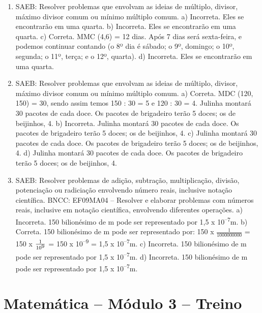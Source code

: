 \begin{enumerate}
\item
SAEB: Resolver problemas que envolvam as ideias de múltiplo, 
divisor, máximo divisor comum ou mínimo múltiplo comum.
a) Incorreta. Eles se encontrarão em uma quarta.
b) Incorreta. Eles se encontrarão em uma quarta.
c) Correta. MMC (4,6) = 12 dias. Após 7 dias será sexta-feira, e podemos 
continuar contando (o 8º dia é sábado; o 9º, domingo; o 10º, segunda;
o 11º, terça; e o 12º, quarta).
d) Incorreta. Eles se encontrarão em uma quarta.

\item
SAEB: Resolver problemas que envolvam as ideias de múltiplo, 
divisor, máximo divisor comum ou mínimo múltiplo comum.
a) Correta. MDC (120, 150) = 30, sendo assim temos 150 : 30 = 5 e 120 : 30 = 4. Julinha montará 30 pacotes de cada doce. Os pacotes de brigadeiro terão 5 doces; os de beijinhos, 4.
b) Incorreta. Julinha montará 30 pacotes de cada doce. Os pacotes de brigadeiro terão 5 doces; os de beijinhos, 4.
c) Julinha montará 30 pacotes de cada doce. Os pacotes de brigadeiro terão 5 doces; os de beijinhos, 4.
d) Julinha montará 30 pacotes de cada doce. Os pacotes de brigadeiro terão 5 doces; os de beijinhos, 4. 

\item
SAEB: Resolver problemas de adição, subtração, multiplicação, 
divisão, potenciação ou radiciação envolvendo número reais, inclusive
notação científica.
BNCC: EF09MA04 -- Resolver e elaborar problemas com números reais, 
inclusive em notação científica, envolvendo diferentes operações.
a) Incorreta. 150 bilionésimo de m pode ser representado por 1,5 x 10\textsuperscript{--7}m.
b) Correta. 150 bilionésimo de m pode ser representado por:
150 x $\frac{1}{1000000000}$ = 150 x $\frac{1}{10\textsuperscript{9}}$ 
= 150 x 10\textsuperscript{--9} = 1,5 x 10\textsuperscript{--7}m.
c) Incorreta. 150 bilionésimo de m pode ser representado por 1,5 x 10\textsuperscript{--7}m.
d) Incorreta. 150 bilionésimo de m pode ser representado por 1,5 x 10\textsuperscript{--7}m.
\end{enumerate}

\section*{Matemática – Módulo 3 – Treino}

